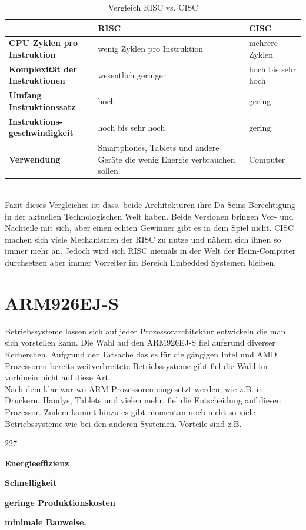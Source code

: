 \begin{table}[h!]
\centering
\begin{tabular}[h!]{|p{4cm}|p{4cm}|p{5cm}|}
	\cline{1-3} 
	& \textbf{RISC} & \textbf{CISC} \\ \hline 
	\textbf{CPU Zyklen pro \newline Instruktion} & wenig Zyklen pro Instruktion & mehrere Zyklen \\ \hline
	\textbf{Komplexit\"at der \newline Instruktionen} & wesentlich geringer & hoch bis sehr hoch\\ \hline
	\textbf{Umfang Instruktionssatz} & hoch & gering \\ \hline
	\textbf{Instruktions-\newline geschwindigkeit} &  hoch bis sehr hoch & gering \\ \hline
	\textbf{Verwendung}  & Smartphones, Tablets und andere Ger\"ate die wenig Energie verbrauchen sollen. & Computer \\ \hline	 
	
\end{tabular}
\caption{Vergleich RISC vs. CISC}
\end{table}
\\
\noindent
Fazit dieses Vergleiches ist dass, beide Architekturen ihre Da-Seins Berechtigung in der aktuellen Technologischen Welt haben. Beide Versionen bringen Vor- und Nachteile mit sich, aber einen echten Gewinner gibt es in dem Spiel nicht. CISC machen sich viele Mechanismen der RISC zu nutze und n\"ahern sich ihnen so immer mehr an. Jedoch wird sich RISC niemals in der Welt der Heim-Computer durchsetzen aber immer Vorreiter im Bereich Embedded Systemen bleiben.
\section{ARM926EJ-S}
Betriebssysteme lassen sich auf jeder Prozessorarchitektur entwickeln die man sich vorstellen kann. Die Wahl auf den ARM926EJ-S fiel aufgrund diverser Recherchen. Aufgrund der Tatsache das es f\"ur die g\"angigen Intel und AMD Prozessoren bereits weitverbreitete Betriebssysteme gibt fiel die Wahl im vorhinein nicht auf diese Art.\\
Nach dem klar war wo ARM-Prozessoren eingesetzt werden, wie z.B. in Druckern, Handys, Tablets und vielen mehr, fiel die Entscheidung auf diesen Prozessor. Zudem kommt hinzu es gibt momentan noch nicht so viele Betriebssysteme wie bei den anderen Systemen. Vorteile sind z.B.
\begin{dinglist}{227}
	\item{\textbf{Energieeffizienz}}
	\item{\textbf{Schnelligkeit}}
	\item{\textbf{geringe Produktionskosten}}
	\item{\textbf{minimale Bauweise.}}
\end{dinglist}
